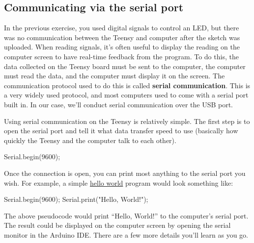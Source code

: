 \documentclass[]{book}
\newenvironment{Shaded}{\begin{snugshade}}{\end{snugshade}}
\newcommand{\DecValTok}[1]{\textcolor[rgb]{0.00,0.00,0.81}{#1}}
\newcommand{\NormalTok}[1]{#1}
\newcommand{\StringTok}[1]{\textcolor[rgb]{0.31,0.60,0.02}{#1}}
\begin{document}
\hypertarget{communicating-via-the-serial-port}{%
\subsection*{Communicating via the serial port}\label{communicating-via-the-serial-port}}

In the previous exercise, you used digital signals to control an LED, but there was no communication between the Teensy and computer after the sketch was uploaded. When reading signals, it's often useful to display the reading on the computer screen to have real-time feedback from the program. To do this, the data collected on the Teensy board must be sent to the computer, the computer must read the data, and the computer must display it on the screen. The communication protocol used to do this is called \textbf{serial communication}. This is a very widely used protocol, and most computers used to come with a serial port built in. In our case, we'll conduct serial communication over the USB port.

Using serial communication on the Teensy is relatively simple. The first step is to open the serial port and tell it what data transfer speed to use (basically how quickly the Teensy and the computer talk to each other).

\begin{Shaded}
\begin{Highlighting}[]
\NormalTok{    Serial.begin(}\DecValTok{9600}\NormalTok{);}
\end{Highlighting}
\end{Shaded}

Once the connection is open, you can print most anything to the serial port you wish. For example, a simple \href{https://en.wikipedia.org/wiki/\%22Hello,_World!\%22_program}{hello world} program would look something like:

\begin{Shaded}
\begin{Highlighting}[]
\NormalTok{    Serial.begin(}\DecValTok{9600}\NormalTok{);}
\NormalTok{    Serial.print(}\StringTok{"Hello, World!"}\NormalTok{);}
\end{Highlighting}
\end{Shaded}

The above pseudocode would print ``Hello, World!'' to the computer's serial port. The result could be displayed on the computer screen by opening the serial monitor in the Arduino IDE. There are a few more details you'll learn as you go.
\end{document}
